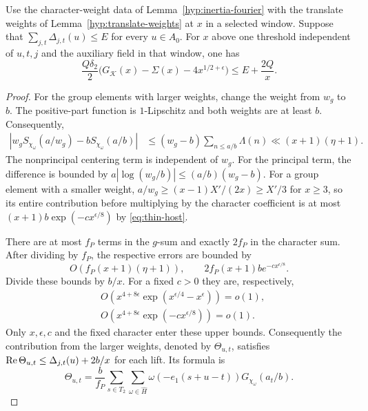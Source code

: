 \begin{proposition}\label{prop:translate-fourier}
Use the character-weight data of Lemma~\ref{hyp:inertia-fourier}
with the translate weights of Lemma~\ref{hyp:translate-weights}
at \(x\) in a selected window. Suppose that
\(\sum_{j,t}\Delta_{j,t}(u)\le E\) for every \(u\in A_0\).
For \(x\) above one threshold independent of \(u,t,j\) and the
auxiliary field in that window, one has
\begin{equation}\label{eq:fourier-compare}
 \frac{Q\delta_2}{2}
       \bigl(G_{\mathcal K}(x)-\Sigma(x)-4x^{1/2+\epsilon}\bigr)
       \leq E+\frac{2Q}{x}.
\end{equation}
\end{proposition}

\begin{proof}
For the group elements with larger weights, change the weight from \(w_g\) to \(b\).
The positive-part function is \(1\)-Lipschitz and both weights
are at least \(b\). Consequently,
\[
 \begin{aligned}
 |w_g S_{\chi_\omega}(a/w_g)-b S_{\chi_\omega}(a/b)|
 &\le (w_g-b)\sum_{n\le a/b}\Lambda(n)
 \ll (x+1)(\eta+1).
 \end{aligned}
\]
The nonprincipal centering term is independent of \(w_g\).
For the principal term, the difference is bounded by
\(a|\log(w_g/b)|\le(a/b)(w_g-b)\). For a group element with a smaller weight,
\(a/w_g\ge (x-1)X'/(2x)\ge X'/3\) for \(x\ge3\), so its entire
contribution before multiplying by the character coefficient is at
most \((x+1)b\exp(-c x^{\epsilon/8})\) by \eqref{eq:thin-host}.


There are at most \(f_P\) terms in the \(g\)-sum and exactly
\(2f_P\) in the character sum. After dividing by \(f_P\), the
respective errors are bounded by
\[
 O(f_P(x+1)(\eta+1)),\qquad
 2f_P(x+1)b e^{-c x^{\epsilon/8}}.
\]
Divide these bounds by \(b/x\). For a fixed \(c>0\) they are, respectively,
\[
 \begin{aligned}
 &O\!\left(x^{4+8\epsilon}\exp(x^{\epsilon/4}-x^\epsilon)\right)=o(1),\\
 &O\!\left(x^{4+8\epsilon}\exp(-c x^{\epsilon/8})\right)=o(1).
 \end{aligned}
\]
Only \(x,\epsilon,c\) and the fixed character enter these upper bounds. Consequently the contribution from the
larger weights, denoted by \(\Theta_{u,t}\), satisfies
\(\operatorname{Re}\Theta_{u,t}\le\Delta_{j,t}(u)+2b/x\) for each lift.
Its formula is
\[
  \Theta_{u,t}=\frac b{f_P}\sum_{s\in T_2}\sum_{\omega\in\widehat H}
       \omega(-e_1(s+u-t))G_{\chi_\omega}(a_t/b).
\]


\end{proof}
